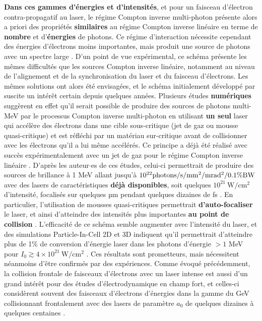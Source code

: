 \begin{refsection}
\textbf{Dans ces gammes d'énergies et d'intensités}, et pour un faisceau d'électron contra-propagatif au laser, le régime Compton inverse multi-photon présente alors a priori des propriétés \textbf{similaires} au régime Compton inverse linéaire en terme de \textbf{nombre} et d'\textbf{énergies} de photons. Ce régime d'interaction nécessite cependant des énergies d'électrons moins importantes, mais produit une source de photons avec un spectre large \parencite{corde_2013a, sarri_2014}. D'un point de vue expérimental, ce schéma présente les mêmes difficultés que les sources Compton inverse linéaire, notamment au niveau de l'alignement et de la synchronisation du laser et du faisceau d'électrons. 
Les mêmes solutions ont alors été envisagées, et le schéma initialement développé par \cite{phuoc_2012} suscite un intérêt certain depuis quelques années. Plusieurs études \textbf{numériques} \parencite{huang_2019,long_2019,ong_2019,jirka_2020b} suggèrent en effet qu'il serait possible de produire des sources de photons multi-MeV par le processus Compton inverse multi-photon en utilisant \textbf{un seul} laser qui accélère des électrons dans une cible sous-critique (jet de gaz ou mousse quasi-critique) et est réfléchi par un matériau sur-critique avant de collisionner avec les électrons qu'il a lui même accélérés. Ce principe a déjà été réalisé avec succès expérimentalement avec un jet de gaz pour le régime Compton inverse linéaire \parencite{phuoc_2012, yu_2016}. D'après les auteur$\cdot$es de ces études, celui-ci permettrait de produire des sources de brillance à 1 MeV allant jusqu'à $10^{22} \rm photons /s/mm^2/mrad^2/0.1\%BW$ avec des lasers de caractéristiques \textbf{déjà disponibles}, soit quelques $10^{21} ~ \si{\W \per \cm^2}$ d'intensité, focalisés sur quelques µm pendant quelques dizaines de fs \parencite{huang_2018, huang_2019}. En particulier, l'utilisation de mousses quasi-critiques permettrait \textbf{d'auto-focaliser} le laser, et ainsi d'atteindre des intensités plus importantes \textbf{au point de collision} \parencite{huang_2019}. L'efficacité de ce schéma semble augmenter avec l'intensité du laser, et des simulations Particle-In-Cell 2D et 3D indiquent qu'il permettrait d'atteindre plus de 1\% de conversion d'énergie laser dans les photons d'énergie $>1$ MeV pour $I_0 \gtrsim 4 \times 10^{21} ~ \si{\W \per \cm^2}$ \parencite{huang_2018}. Ces résultats sont prometteurs, mais nécessitent néanmoins d'être confirmés par des expériences. Comme évoqué précédemment, la collision frontale de faisceaux d'électrons avec un laser intense est aussi d'un grand intérêt pour des études d'électrodynamique en champ fort, et celles-ci considèrent souvent des faisceaux d'électrons d'énergies dans la gamme du GeV collisionnant frontalement avec des lasers de paramètre $a_0$ de quelques dizaines à quelques centaines \parencite{bula_1996, poder_2018, cole_2018a, dipiazza_2012, zhang_2020, vranic_2014}. 


\end{refsection}
